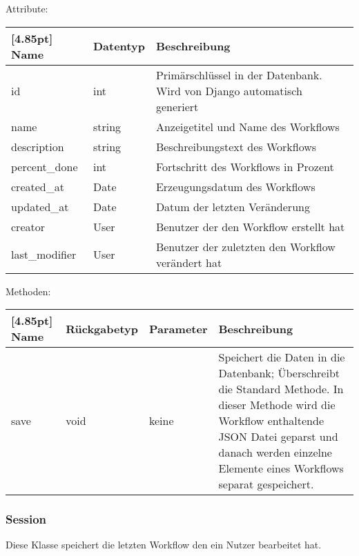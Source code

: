 			Attribute:
			\begin{center}
				\renewcommand{\arraystretch}{1.5}
				\setlength\tabcolsep{5pt}
				\begin{tabularx}{\textwidth}{|l|l|X|}
					\hline
					\rowcolor[gray]{0.75}[4.85pt]					
					Name & Datentyp & Beschreibung \\ \hline
					id & int & Primärschlüssel in der Datenbank. Wird von Django automatisch generiert \\ \hline
					name & string & Anzeigetitel und Name des Workflows\\ \hline
					description & string & Beschreibungstext des Workflows\\ \hline	
					percent\_done & int & Fortschritt des Workflows in Prozent\\ \hline
					created\_at & Date & Erzeugungsdatum des Workflows \\ \hline
					updated\_at & Date & Datum der letzten Veränderung \\ \hline 
					creator & User & Benutzer der den Workflow erstellt hat\\ \hline
					last\_modifier & User & Benutzer der zuletzten den Workflow verändert hat\\ \hline
				\end{tabularx}
			\end{center}

		
			 Methoden:
			\begin{center}
				\setlength\tabcolsep{5pt}
				\renewcommand{\arraystretch}{1.5}
				
				\begin{tabularx}{\textwidth}{|l|l|l|X|}
					\hline
					\rowcolor[gray]{0.75}[4.85pt]
					Name & Rückgabetyp & Parameter & Beschreibung \\ \hline 
					save & void & keine & Speichert die Daten in die Datenbank; Überschreibt die Standard Methode. In dieser Methode wird die Workflow enthaltende JSON Datei geparst und danach werden einzelne Elemente eines Workflows separat gespeichert. \\ 
					\hline
				\end{tabularx}
			\end{center}

		\subsubsection{Session}
		
		Diese Klasse speichert die letzten Workflow den ein Nutzer bearbeitet hat.
		
